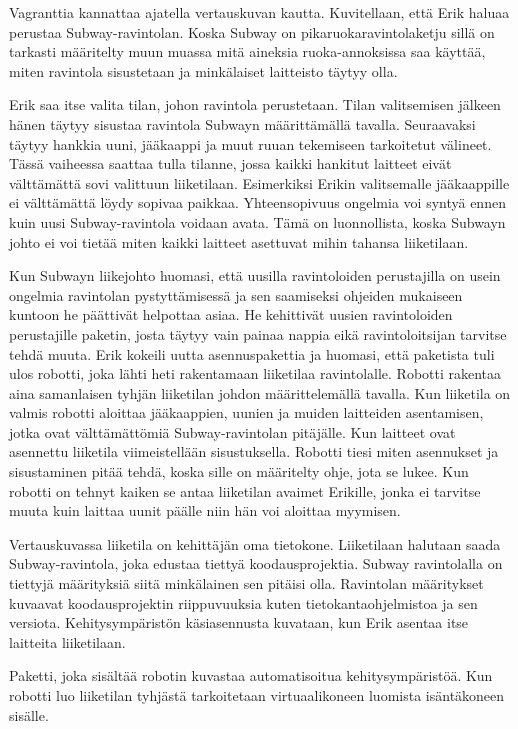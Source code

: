 Vagranttia kannattaa ajatella vertauskuvan kautta. Kuvitellaan, että Erik haluaa perustaa Subway-ravintolan. Koska Subway on pikaruokaravintolaketju sillä on tarkasti määritelty muun muassa mitä aineksia ruoka-annoksissa saa käyttää, miten ravintola sisustetaan ja minkälaiset laitteisto täytyy olla.

Erik saa itse valita tilan, johon ravintola perustetaan. Tilan valitsemisen jälkeen hänen täytyy sisustaa ravintola Subwayn määrittämällä tavalla. Seuraavaksi täytyy hankkia uuni, jääkaappi ja muut ruuan tekemiseen tarkoitetut välineet. Tässä vaiheessa saattaa tulla tilanne, jossa kaikki hankitut laitteet eivät välttämättä sovi valittuun liiketilaan. Esimerkiksi Erikin valitsemalle jääkaappille ei välttämättä löydy sopivaa paikkaa. Yhteensopivuus ongelmia voi syntyä ennen kuin uusi Subway-ravintola voidaan avata. Tämä on luonnollista, koska Subwayn johto ei voi tietää miten kaikki laitteet asettuvat mihin tahansa liiketilaan.

Kun Subwayn liikejohto huomasi, että uusilla ravintoloiden perustajilla on usein ongelmia ravintolan pystyttämisessä ja sen saamiseksi ohjeiden mukaiseen kuntoon he päättivät helpottaa asiaa. He kehittivät uusien ravintoloiden perustajille paketin, josta täytyy vain painaa nappia eikä ravintoloitsijan tarvitse tehdä muuta. Erik kokeili uutta asennuspakettia ja huomasi, että paketista tuli ulos robotti, joka lähti heti rakentamaan liiketilaa ravintolalle. Robotti rakentaa aina samanlaisen tyhjän liiketilan johdon määrittelemällä tavalla. Kun liiketila on valmis robotti aloittaa jääkaappien, uunien ja muiden laitteiden asentamisen, jotka ovat välttämättömiä Subway-ravintolan pitäjälle. Kun laitteet ovat asennettu liiketila viimeistellään sisustuksella. Robotti tiesi miten asennukset ja sisustaminen pitää tehdä, koska sille on määritelty ohje, jota se lukee. Kun robotti on tehnyt kaiken se antaa liiketilan avaimet Erikille, jonka ei tarvitse muuta kuin laittaa uunit päälle niin hän voi aloittaa myymisen.

Vertauskuvassa liiketila on kehittäjän oma tietokone. Liiketilaan halutaan saada Subway-ravintola, joka edustaa tiettyä koodausprojektia. Subway ravintolalla on tiettyjä määrityksiä siitä minkälainen sen pitäisi olla. Ravintolan määritykset kuvaavat koodausprojektin riippuvuuksia kuten tietokantaohjelmistoa ja sen versiota. Kehitysympäristön käsiasennusta kuvataan, kun Erik asentaa itse laitteita liiketilaan.

Paketti, joka sisältää robotin kuvastaa automatisoitua kehitysympäristöä. Kun robotti luo liiketilan tyhjästä tarkoitetaan virtuaalikoneen luomista isäntäkoneen sisälle.

